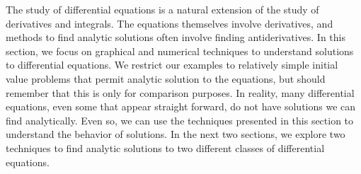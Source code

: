 
The study of differential equations is a natural extension of the study of derivatives and integrals.  The equations themselves involve derivatives, and methods to find analytic solutions often involve finding antiderivatives.   In this section, we focus on graphical and numerical techniques to understand solutions to differential equations.  We restrict our examples to relatively simple initial value problems that permit analytic solution to the equations, but should remember that this is only for comparison purposes.  In reality, many differential equations, even some that appear straight forward, do not have solutions we can find analytically.  Even so, we can use the techniques presented in this section to understand the behavior of solutions.  In the next two sections, we explore two techniques to find analytic solutions to two different classes of differential equations.

